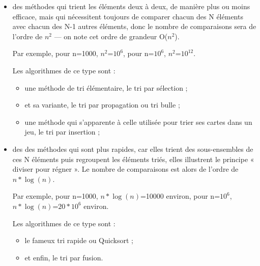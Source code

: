 \documentclass[11pt,a4paper]{article}
\begin{document}
\begin{itemize}
    \item des méthodes qui trient les éléments deux à deux, de manière plus ou moins
          efficace, mais qui nécessitent toujours de comparer chacun des N éléments avec
          chacun des N-1 autres éléments, donc le nombre de comparaisons sera de l’ordre
          de $n^2$ — on note cet ordre de grandeur \displaystyle O($n^2$).
          \vspace{0.1cm}

          Par exemple, pour n=1000, $n^2$=$10^6$, pour n=$10^6$, $n^2$=$10^{12}$.
          \vspace{0.2cm}

          Les algorithmes de ce type sont :
          \begin{itemize}
              \item une méthode de tri élémentaire, le tri par sélection ;
              \item et sa variante, le tri par propagation ou tri bulle ;
              \item une méthode qui s’apparente à celle utilisée pour trier ses cartes dans un jeu,
                    le tri par insertion ;
          \end{itemize}
          \vspace{0.2cm}

    \item des des méthodes qui sont plus rapides, car elles trient des sous-ensembles de ces N éléments puis regroupent les
          éléments triés, elles illustrent le principe « diviser pour régner ». Le nombre de comparaisons est alors de l’ordre de
          $n*\log(n)$.
          \vspace{0.1cm}

          Par exemple, pour n=1000, $n*\log(n)$=10000 environ, pour {n=$10^6$}, $n*\log(n)$=$20*10^6$ environ.
          \vspace{0.2cm}

          Les algorithmes de ce type sont :
          \begin{itemize}

              \item le fameux tri rapide ou Quicksort ;
              \item et enfin, le tri par fusion.
          \end{itemize}
          \vspace{0.1cm}


\end{itemize}
\end{document}
